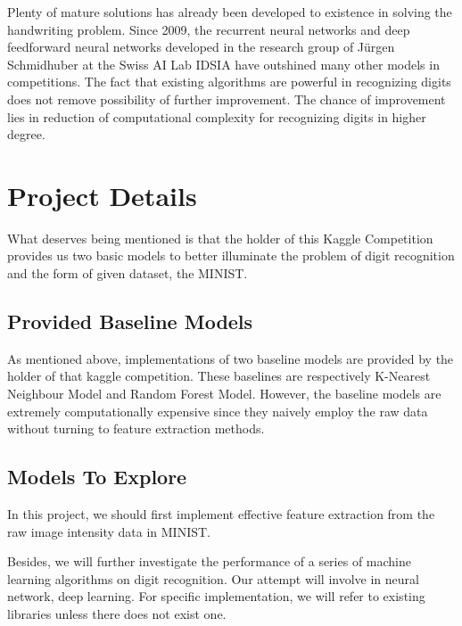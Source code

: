 \documentclass{article} %
\begin{document}
Plenty of mature solutions has already been developed to existence in solving
the handwriting problem. 
Since 2009, the recurrent neural networks and deep feedforward neural networks
developed in the research group of Jürgen Schmidhuber at the Swiss AI Lab
IDSIA have outshined many other models in competitions.
The fact that existing algorithms are powerful in recognizing digits does not
remove possibility of further improvement. The chance of improvement lies in
reduction of computational complexity for recognizing digits in higher degree.



\section{Project Details}

What deserves being mentioned is that the holder of this Kaggle Competition
provides us two basic models to better illuminate the problem of digit
recognition and the form of given dataset, the MINIST.

\subsection{Provided Baseline Models}
As mentioned above, implementations of two baseline models are provided by the
holder of that kaggle competition. These baselines are respectively K-Nearest
Neighbour Model and Random Forest Model. However, the baseline models are
extremely computationally expensive since they naively employ the raw data
without turning to feature extraction methods.

\subsection{Models To Explore}
In this project, we should first implement effective feature extraction from
the raw image intensity data in MINIST.

Besides, we will further investigate the performance of a series of machine learning
algorithms on digit recognition. Our attempt will involve in neural network,
deep learning. For specific implementation, we will refer to existing
libraries unless there does not exist one.
\end{document}
